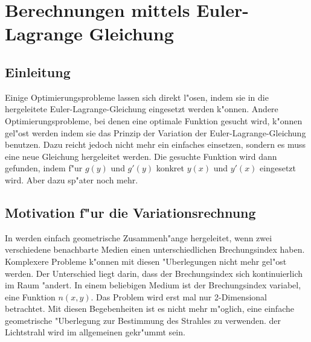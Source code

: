 \section{Berechnungen mittels Euler-Lagrange Gleichung}
\subsection{Einleitung}
Einige Optimierungsprobleme lassen sich direkt l"osen, indem sie in die
hergeleitete Euler-Lagrange-Gleichung eingesetzt werden k"onnen. Andere
Optimierungsprobleme, bei denen eine optimale Funktion gesucht
wird, k"onnen gel"ost werden indem sie das Prinzip der Variation der
Euler-Lagrange-Gleichung benutzen. Dazu reicht jedoch nicht mehr ein
einfaches einsetzen, sondern es muss eine neue Gleichung hergeleitet
werden. Die gesuchte Funktion wird dann gefunden, indem f"ur $g(y)$ und
$g'(y)$ konkret $y(x)$ und $y'(x)$ eingesetzt wird. Aber dazu sp"ater
noch mehr.

\subsection{Motivation f"ur die Variationsrechnung}
In  werden einfach geometrische Zusammenh"ange
hergeleitet, wenn zwei verschiedene benachbarte Medien einen
unterschiedlichen Brechungsindex haben. Komplexere Probleme k"onnen mit
diesen "Uberlegungen nicht mehr gel"ost werden. Der Unterschied liegt
darin, dass der Brechungsindex sich kontinuierlich im Raum "andert. In
einem  beliebigen  Medium  ist  der Brechungsindex variabel, eine
Funktion $n(x,y)$. Das  Problem wird erst mal nur 2-Dimensional
betrachtet. Mit diesen Begebenheiten ist es nicht mehr m"oglich, eine
einfache geometrische "Uberlegung  zur  Bestimmung  des  Strahles  zu
verwenden. der Lichtstrahl wird im allgemeinen gekr"ummt sein.

